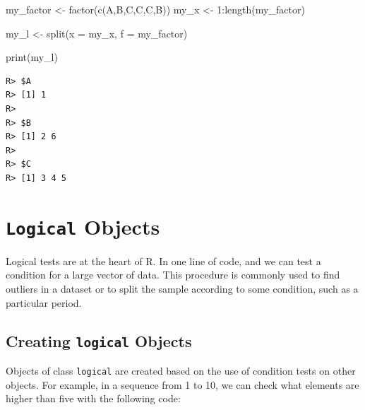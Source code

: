 \documentclass[
  12pt,
]{book}
\newenvironment{Shaded}{\begin{snugshade}}{\end{snugshade}}
\newcommand{\AttributeTok}[1]{\textcolor[rgb]{0.61,0.61,0.61}{#1}}
\newcommand{\DecValTok}[1]{\textcolor[rgb]{0.06,0.06,0.06}{#1}}
\newcommand{\FunctionTok}[1]{\textcolor[rgb]{0,0,0}{#1}}
\newcommand{\NormalTok}[1]{#1}
\newcommand{\OtherTok}[1]{\textcolor[rgb]{0.37,0.37,0.37}{#1}}
\newcommand{\SpecialCharTok}[1]{\textcolor[rgb]{0,0,0}{#1}}
\newcommand{\StringTok}[1]{\textcolor[rgb]{0.5,0.5,0.5}{#1}}
\begin{document}
\begin{Shaded}
\begin{Highlighting}[]
\NormalTok{my\_factor }\OtherTok{\textless{}{-}} \FunctionTok{factor}\NormalTok{(}\FunctionTok{c}\NormalTok{(}\StringTok{\textquotesingle{}A\textquotesingle{}}\NormalTok{,}\StringTok{\textquotesingle{}B\textquotesingle{}}\NormalTok{,}\StringTok{\textquotesingle{}C\textquotesingle{}}\NormalTok{,}\StringTok{\textquotesingle{}C\textquotesingle{}}\NormalTok{,}\StringTok{\textquotesingle{}C\textquotesingle{}}\NormalTok{,}\StringTok{\textquotesingle{}B\textquotesingle{}}\NormalTok{))}
\NormalTok{my\_x }\OtherTok{\textless{}{-}} \DecValTok{1}\SpecialCharTok{:}\FunctionTok{length}\NormalTok{(my\_factor)}

\NormalTok{my\_l }\OtherTok{\textless{}{-}} \FunctionTok{split}\NormalTok{(}\AttributeTok{x =}\NormalTok{ my\_x, }\AttributeTok{f =}\NormalTok{ my\_factor)}

\FunctionTok{print}\NormalTok{(my\_l)}
\end{Highlighting}
\end{Shaded}

\begin{verbatim}
R> $A
R> [1] 1
R> 
R> $B
R> [1] 2 6
R> 
R> $C
R> [1] 3 4 5
\end{verbatim}

\hypertarget{logical-objects}{%
\section{\texorpdfstring{\texttt{Logical} Objects}{Logical Objects}}\label{logical-objects}}

Logical tests are at the heart of R. In one line of code, and we can test a condition for a large vector of data. This procedure is commonly used to find outliers in a dataset or to split the sample according to some condition, such as a particular period.

\hypertarget{creating-logical-objects}{%
\subsection{\texorpdfstring{Creating \texttt{logical} Objects}{Creating logical Objects}}\label{creating-logical-objects}}

Objects of class \texttt{logical} are created based on the use of condition tests on other objects. For example, in a sequence from 1 to 10, we can check what elements are higher than five with the following code:
\end{document}
